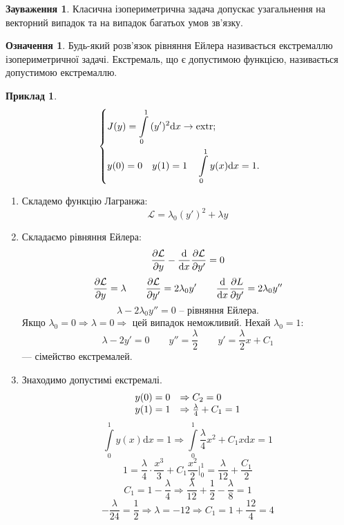 \documentclass[14pt,a4paper]{scrartcl}
\theoremstyle{definition}
\newtheorem*{defo}{Означення}
\newtheorem*{example}{Приклад}
\newtheorem*{remark}{Зауваження}
\theoremstyle{definition}
\theoremstyle{definition}
\begin{document}
\begin{remark}
  Класична ізопериметрична задача допускає узагальнення на векторний випадок та  на випадок багатьох умов зв'язку.
\end{remark}
\begin{defo}
 Будь-який розв'язок рівняння Ейлера називається екстремаллю ізопериметричної задачі. Екстремаль, що є допустимою функцією, називається допустимою екстремаллю.
\end{defo}
\begin{example}
 $$
 \begin{dcases}
  J(y) =  \int\limits_{0}^{1}{(y')^2 \mathrm{d} x} \to \mathrm{extr};\\
  y(0) = 0 \quad y(1) = 1 \quad  \int\limits_{0}^{1}{y(x) \mathrm{d} x} = 1.
 \end{dcases}
 $$
 \begin{enumerate}
   \item Складемо функцію Лагранжа:
   $$
   \mathcal{L} = \lambda_0 (y')^2 + \lambda y
   $$
   \item Складаємо рівняння Ейлера:
   $$
   \frac{\partial \mathcal{L}}{\partial y}  - \frac{\mathrm{d}}{\mathrm{d} x} \frac{\partial \mathcal{L}}{\partial y'} = 0
   $$
   $$
   \frac{\partial \mathcal{L}}{ \partial y} = \lambda \qquad \frac{\partial \mathcal{L}}{\partial y'} = 2 \lambda_0 y' \qquad
   \frac{\mathrm{d}}{\mathrm{d} x } \frac{\partial L}{\partial y'} = 2 \lambda_0 y''
   $$
   $$
   \lambda - 2 \lambda_0 y'' = 0 \text{ -- рівняння Ейлера.}
   $$
   Якщо $\lambda_0 = 0 \Rightarrow \lambda = 0 \Rightarrow$ цей випадок неможливий. Нехай $\lambda_0 = 1$:
   $$
   \lambda - 2 y' = 0 \qquad y'' = \frac{\lambda}{2} \qquad y' = \frac{\lambda}{2} x + C_1
   $$
    --- сімейство екстремалей.
   \item Знаходимо допустимі екстремалі.
   $$
\begin{array}{r l}
y(0) = 0 &\Rightarrow C_2 = 0\\
y(1) = 1 & \Rightarrow \frac{\lambda}{4} + C_1 = 1
\end{array}
   $$
   $$
    \int\limits_{0}^{1}{y(x) \mathrm{d} x} = 1 \Rightarrow  \int\limits_{0}^{1}{
    \frac{\lambda}{4}x^2 + C_1 x \mathrm{d} x = 1
    }
   $$
   $$
   1 = \frac{\lambda}{4} \cdot \frac{x^3}{3} + C_1 \frac{x^2}{2}\bigg|_0^1 = \frac{\lambda}{12} + \frac{C_1}{2}
   $$
   $$
   C_1 = 1 - \frac{\lambda}{4} \Longrightarrow \frac{\lambda}{12} + \frac{1}{2} - \frac{\lambda}{8} = 1
   $$
   $$
   - \frac{\lambda}{24} = \frac{1}{2} \Longrightarrow \lambda = -12 \Longrightarrow C_1 = 1 + \frac{12}{4} = 4
$$
\end{enumerate}
\end{example}
\end{document}

